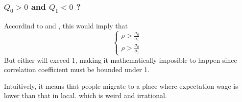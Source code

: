 \subsubsection{$Q_0>0$ and $Q_1<0$ ?}\label{sec:imposible_case}

Accordind to  and , this would imply that
$$
\begin{cases}
    \rho>\frac{\sigma_0}{\sigma_1}\\
    \rho>\frac{\sigma_0}{\sigma_1}
\end{cases}
$$
But either will exceed 1, making it mathematically imposible to happen since correlation coefficient must be bounded under 1.

Intuitively, it means that people migrate to a place where expectation wage is lower than that in local.
which is weird and irrational.